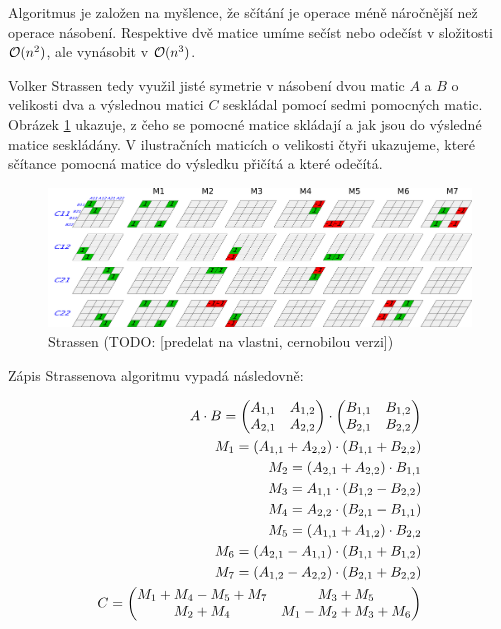 Algoritmus je založen na myšlence, že sčítání je operace méně náročnější než operace násobení. Respektive dvě matice umíme sečíst nebo odečíst v složitosti $\mathcal{O}(n^2)$, ale vynásobit v $\mathcal{O}(n^3)$.

Volker Strassen tedy využil jisté symetrie \cite{StrNat} v násobení dvou matic $A$ a $B$ o velikosti dva a výslednou matici $C$ seskládal pomocí sedmi pomocných matic. Obrázek \ref{fig:StrVis} ukazuje, z čeho se pomocné matice skládají a jak jsou do výsledné matice seskládány. V ilustračních maticích o velikosti čtyři ukazujeme, které sčítance pomocná matice do výsledku přičítá a které odečítá. 

\begin{figure}[H]\centering
	\includegraphics[width=\textwidth]{./images/strassen}
	\caption{Strassen (TODO: [predelat na vlastni, cernobilou verzi])}
	\label{fig:StrVis}
\end{figure}

Zápis Strassenova algoritmu vypadá následovně:	

\begin{align}
A \cdot B = \begin{pmatrix}
 A_{1,1} & A_{1,2} \\
 A_{2,1} & A_{2,2} \\
\end{pmatrix} \cdot \begin{pmatrix}
 B_{1,1} & B_{1,2} \\
 B_{2,1} & B_{2,2} \\
\end{pmatrix} \notag\\
M_{1} = (A_{1,1} + A_{2,2}) \cdot (B_{1,1} + B_{2,2}) \notag\\
M_{2} = (A_{2,1} + A_{2,2}) \cdot B_{1,1} \notag\\
M_{3} = A_{1,1} \cdot (B_{1,2} - B_{2,2}) \notag\\
M_{4} = A_{2,2} \cdot (B_{2,1} - B_{1,1}) \notag\\
M_{5} = (A_{1,1} + A_{1,2}) \cdot B_{2,2} \notag\\
M_{6} = (A_{2,1} - A_{1,1}) \cdot (B_{1,1} + B_{1,2}) \notag\\
M_{7} = (A_{1,2} - A_{2,2}) \cdot (B_{2,1} + B_{2,2}) \notag\\
C = \begin{pmatrix}
 M_{1} + M_{4} - M_{5} + M_{7} & M_{3} + M_{5} \\
 M_{2} + M_{4} & M_{1} - M_{2} + M_{3} + M_{6}
\end{pmatrix}
\end{align}

